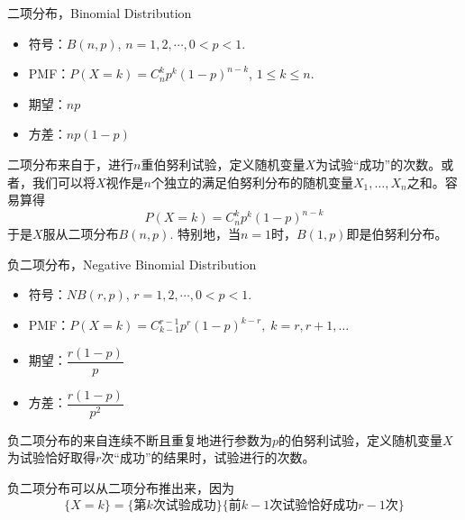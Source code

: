 \begin{frame}

\begin{block}{二项分布，Binomial Distribution}
\begin{itemize}
\item 符号：$B(n,p)$, \; $n = 1,2,\cdots, 0<p<1$.
\item PMF：$P(X = k) = C_n^kp^k(1-p)^{n-k}$, \; $1\le k \le n$.
\item 期望：$np$
\item 方差：$np(1-p)$
\end{itemize}

\vspace{1em}
\pause

二项分布来自于，进行$n$重伯努利试验，定义随机变量$X$为试验``成功''的次数。或者，我们可以将$X$视作是$n$个独立的满足伯努利分布的随机变量$X_1,\ldots,X_n$之和。容易算得
$$P(X=k) = C_n^kp^k(1-p)^{n-k}$$
于是$X$服从二项分布$B(n,p)$. 特别地，当$n=1$时，$B(1,p)$即是伯努利分布。
\end{block}

\end{frame}


\begin{frame}

\begin{block}{负二项分布，Negative Binomial Distribution}
\begin{itemize}
\item 符号：$NB(r,p)$, \; $r = 1,2,\cdots, 0<p<1$.
\item PMF：$P(X = k) = C_{k-1}^{r-1} p^r(1-p)^{k-r}, \; k = r, r+1, \ldots$
\item 期望：$\dfrac{r(1-p)}{p}$
\item 方差：$\dfrac{r(1-p)}{p^2}$
\end{itemize}

\vspace{1em}
\pause

负二项分布的来自连续不断且重复地进行参数为$p$的伯努利试验，定义随机变量$X$为试验恰好取得$r$次``成功''的结果时，试验进行的次数。

负二项分布可以从二项分布推出来，因为
$$\{X=k\} = \{\text{第$k$次试验成功}\}\{\text{前$k-1$次试验恰好成功$r-1$次}\}$$
\end{block}

\end{frame}


